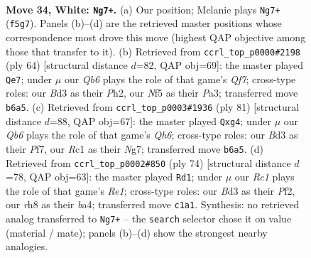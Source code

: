 \documentclass[11pt]{article}
\begin{document}
\clearpage

\begin{figure}[p]\centering
\begin{subfigure}{0.46\textwidth}\centering
\resizebox{\linewidth}{!}{%
\newchessgame
\chessboard[
  setfen={4k1nr/1b1q4/1Q6/r3PN2/7p/3B3P/1p4P1/2R3KR w - - 0 34},
  showmover=false,
  pgfstyle=straightmove, color=movearrow, markmove={f5-g7}
]}
\caption{}
\end{subfigure}\hfill
\begin{subfigure}{0.46\textwidth}\centering
\resizebox{\linewidth}{!}{%
\newchessgame
\chessboard[
  setfen={6rk/1b3Qb1/1q2N1p1/4p3/p7/P2P4/6PP/5R1K w - - 5 33},
  showmover=false,
  pgfstyle=straightmove, color=movearrow, markmove={f7-e7}
]}
\caption{}
\end{subfigure}
\\[4pt]
\begin{subfigure}{0.46\textwidth}\centering
\resizebox{\linewidth}{!}{%
\newchessgame
\chessboard[
  setfen={4r1k1/5pn1/5Bp1/p3P3/P5R1/1N5q/3Q1K2/8 b - - 0 41},
  showmover=false,
  pgfstyle=straightmove, color=movearrow, markmove={h3-g4}
]}
\caption{}
\end{subfigure}\hfill
\begin{subfigure}{0.46\textwidth}\centering
\resizebox{\linewidth}{!}{%
\newchessgame
\chessboard[
  setfen={1q5k/6rp/p3pQ2/P7/bP1N4/8/3p1PP1/4R1K1 w - - 0 38},
  showmover=false,
  pgfstyle=straightmove, color=movearrow, markmove={e1-d1}
]}
\caption{}
\end{subfigure}
\caption{\textbf{Move 34, White: \texttt{Ng7+}.} (a) Our position; Melanie plays \texttt{Ng7+} (\texttt{f5g7}). Panels (b)--(d) are the retrieved master positions whose correspondence most drove this move (highest QAP objective among those that transfer to it). (b) Retrieved from \texttt{ccrl\_top\_p0000\#2198} (ply 64) [structural distance $d$=82, QAP obj=69]: the master played \texttt{Qe7}; under $\mu$ our \emph{Qb6} plays the role of that game's \emph{Qf7}; cross-type roles: our \emph{B}d3 as their \emph{P}h2, our \emph{N}f5 as their \emph{P}a3; transferred move \texttt{b6a5}. (c) Retrieved from \texttt{ccrl\_top\_p0003\#1936} (ply 81) [structural distance $d$=88, QAP obj=67]: the master played \texttt{Qxg4}; under $\mu$ our \emph{Qb6} plays the role of that game's \emph{Qh6}; cross-type roles: our \emph{B}d3 as their \emph{P}f7, our \emph{R}c1 as their \emph{N}g7; transferred move \texttt{b6a5}. (d) Retrieved from \texttt{ccrl\_top\_p0002\#850} (ply 74) [structural distance $d$=78, QAP obj=63]: the master played \texttt{Rd1}; under $\mu$ our \emph{Rc1} plays the role of that game's \emph{Re1}; cross-type roles: our \emph{B}d3 as their \emph{P}f2, our \emph{r}h8 as their \emph{b}a4; transferred move \texttt{c1a1}. Synthesis: no retrieved analog transferred to \texttt{Ng7+} -- the \texttt{search} selector chose it on value (material / mate); panels (b)--(d) show the strongest nearby analogies.}
\label{fig:thought-m66}
\end{figure}
\end{document}
